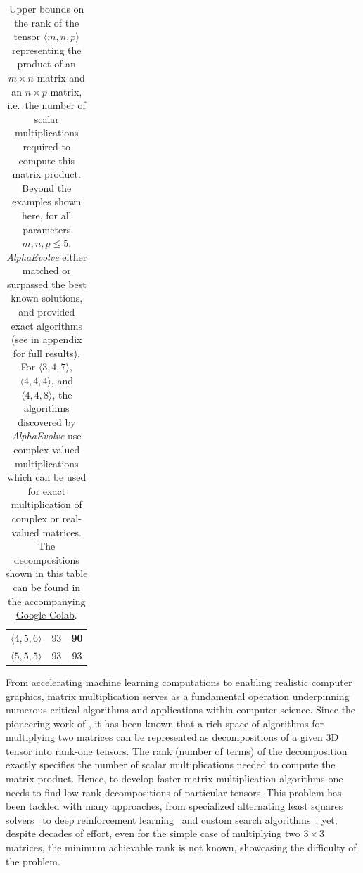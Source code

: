 \documentclass[logo,copyright,12pt]{googledeepmind}
\theoremstyle{definition}
\theoremstyle{remark}
\theoremstyle{plain}
\newcommand{\ResultsColabURL}{https://colab.research.google.com/github/google-deepmind/alphaevolve\_results/blob/master/mathematical\_results.ipynb}
\newcommand{\ResultsColab}{the accompanying \href{\ResultsColabURL}{Google Colab}}
\newcommand{\method}{\emph{AlphaEvolve}\xspace}
\begin{document}
\begin{table}[t]
\begin{center}
\begin{tabular}{ccc}
    $\langle 4, 5, 6 \rangle$ & 93 \citep{Kauers_2025}   & \textbf{90}    \\ 
    $\langle 5, 5, 5 \rangle$ & 93 \citep{flip_graphs_with_symmetry}  & 93  \\ 
    \end{tabular}
\caption{%
Upper bounds on the rank of the tensor $\langle m,n,p \rangle$ representing the product of an $m\times n$ matrix and an $n\times p$ matrix, i.e.~the number of scalar multiplications required to compute this matrix product.
Beyond the examples shown here, for all parameters $m,n,p\leq 5$, \method either matched or surpassed the best known solutions, and provided exact algorithms (see  in appendix for full results).
For $\langle 3, 4, 7\rangle$, $\langle 4, 4, 4\rangle$, and $\langle 4, 4, 8\rangle$, the algorithms discovered by \method use complex-valued multiplications which can be used for exact multiplication of complex or real-valued matrices.
The decompositions shown in this table can be found in \ResultsColab.%
}
    \label{tab:relaxed-opt-results}
\end{center}
\end{table}

From accelerating machine learning computations to enabling realistic computer graphics, matrix multiplication serves as a fundamental operation underpinning numerous critical algorithms and applications within computer science.
Since the pioneering work of \citet{strassen1969gaussian}, it has been known that a rich space of algorithms for multiplying two matrices can be represented as decompositions of a given 3D tensor into rank-one tensors.
The rank (number of terms) of the decomposition exactly specifies the number of scalar multiplications needed to compute the matrix product.
Hence, to develop faster matrix multiplication algorithms one needs to find low-rank decompositions of particular tensors.
This problem has been tackled with many approaches, from specialized alternating least squares solvers~\citep{smirnov2013bilinear} to deep reinforcement learning~\citep{fawzi2022discovering} and custom search algorithms~\cite{kauers2023flip}; yet, despite decades of effort, even for the simple case of multiplying two $3\times 3$ matrices, the minimum achievable rank is not known, showcasing the difficulty of the problem.
\end{document}

